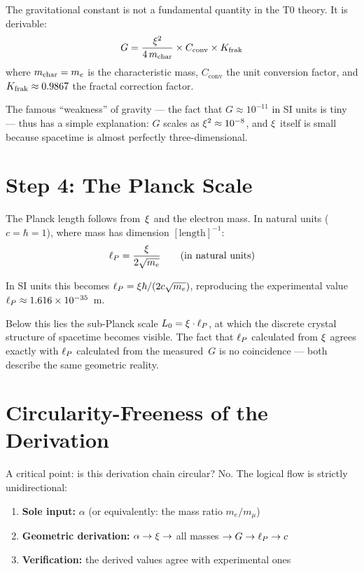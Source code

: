 The gravitational constant is not a fundamental quantity in the T0 theory. It is derivable:
\begin{equation}
G = \frac{\xi^2}{4\,m_{\text{char}}} \times C_{\text{conv}} \times K_{\text{frak}}
\end{equation}
where $m_{\text{char}} = m_e$ is the characteristic mass, $C_{\text{conv}}$ the unit conversion factor, and $K_{\text{frak}} \approx 0.9867$ the fractal correction factor.

The famous ``weakness'' of gravity --- the fact that $G \approx 10^{-11}$ in SI units is tiny --- thus has a simple explanation: $G$ scales as $\xi^2 \approx 10^{-8}$, and $\xi$ itself is small because spacetime is almost perfectly three-dimensional.

\section{Step 4: The Planck Scale}

The Planck length follows from~$\xi$ and the electron mass. In natural units ($c = \hbar = 1$), where mass has dimension $[\text{length}]^{-1}$:
\begin{equation}
\ell_P = \frac{\xi}{2\sqrt{m_e}} \qquad \text{(in natural units)}
\end{equation}

In SI units this becomes $\ell_P = \xi\hbar/(2c\sqrt{m_e})$, reproducing the experimental value $\ell_P \approx 1.616 \times 10^{-35}$~m.

Below this lies the sub-Planck scale $L_0 = \xi \cdot \ell_P$, at which the discrete crystal structure of spacetime becomes visible. The fact that $\ell_P$ calculated from $\xi$ agrees exactly with $\ell_P$ calculated from the measured~$G$ is no coincidence --- both describe the same geometric reality.

\section{Circularity-Freeness of the Derivation}

A critical point: is this derivation chain circular? No. The logical flow is strictly unidirectional:
\begin{enumerate}
\item \textbf{Sole input:} $\alpha$ (or equivalently: the mass ratio $m_e/m_\mu$)
\item \textbf{Geometric derivation:} $\alpha \to \xi \to$ all masses $\to G \to \ell_P \to c$
\item \textbf{Verification:} the derived values agree with experimental ones
\end{enumerate}

